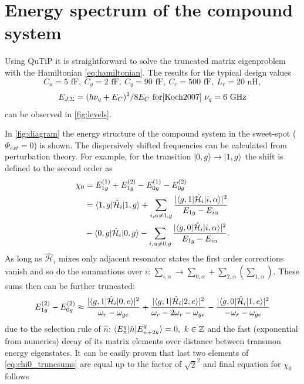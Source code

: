 \documentclass[12pt]{report}
\DeclarePairedDelimiter\bra{\langle}{\rvert}
\DeclarePairedDelimiter\ket{\lvert}{\rangle}
\numberwithin{equation}{section}
\begin{document}
\section{Energy spectrum of the compound system}

Using QuTiP\cite{Johansson2011} it is straightforward to solve the truncated matrix eigenproblem with the Hamiltonian \eqref{eq:hamiltonian}. The results for the typical design values
$$
C_\kappa = 5 \text{ fF},\ C_g = 2 \text{ fF},\ C_q = 90 \text{ fF},\ C_r = 500 \text{ fF},\ L_r = 20 \text{ nH}, $$
$$E_{J, \Sigma} = (h \nu_q + E_C)^2/8 E_C\ \text{for\cite{Koch2007}}\ \nu_q = 6\ \text{GHz}
$$
can be observed in \autoref{fig:levels}.

In \autoref{fig:diagram} the energy structure of the compound system in the sweet-spot ($\Phi_{ext}=0$) is shown. The dispersively shifted frequencies can be calculated from perturbation theory. For example, for the transition $\ket{0, g}\rightarrow \ket{1, g}$ the shift is defined to the second order as
\begin{align*}
\chi_0 &=  E_{1g}^{(1)} + E_{1g}^{(2)} - E_{0g}^{(1)} - E_{0g}^{(2)}\\
 &= \bra{1, g}\mathcal{\hat H}_i\ket{1,g} + \sum_{i, \alpha \neq 1, g} \frac{|\bra{g, 1}\mathcal{\hat H}_i\ket{i,\alpha} |^2}{E_{1g} - E_{i\alpha}}\\
 & - \bra{0, g}\mathcal{\hat H}_i\ket{0,g} - \sum_{i, \alpha \neq 0, g} \frac{|\bra{g, 0}\mathcal{\hat H}_i\ket{i,\alpha} |^2}{E_{1g} - E_{i\alpha}}.
\end{align*}
As long as $\mathcal{\hat H}_i$ mixes only adjacent resonator states the first order corrections vanish and so do the summations over $i$: $\sum_{i, \alpha} \rightarrow \sum_{0,\alpha} + \sum_{2,\alpha} (\sum_{1,\alpha})$. These sums then can be further truncated:
\begin{equation}
E_{1g}^{(2)} - E_{0g}^{(2)} \approx \frac{|\bra{g,1}\mathcal{\hat H}_i\ket{0,e}|^2}{\omega_r - \omega_{ge}} + \frac{|\bra{g,1}\mathcal{\hat H}_i\ket{2,e}|^2}{\omega_r - 2\omega_r - \omega_{ge}} -
\frac{|\bra{g,0}\mathcal{\hat H}_i\ket{1,e}|^2}{-\omega_r - \omega_{ge}}\label{eq:chi0_truncsums}
\end{equation} 
due to the selection rule of $\hat n$: $\bra{E^q_n}\hat n \ket{E^q_{n+2k}} = 0,\ k \in \mathbb{Z}$ and the fast (exponential from numerics) decay of its matrix elements over distance between transmon energy eigenstates. It can be easily proven that last two elements of \eqref{eq:chi0_truncsums} are equal up to the factor of $\sqrt{2}^2$ and final equation for $\chi_0$ follows
\end{document}
